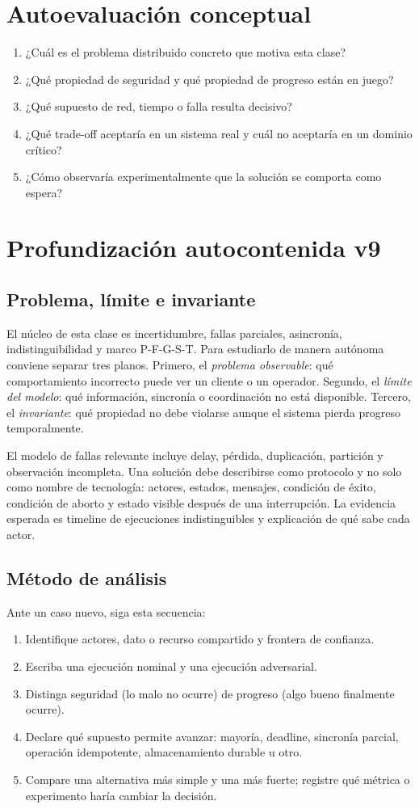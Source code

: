 \documentclass[variant=apuntes,cover=institutional,mode=screen]{ua-engineering-v6-article}
\begin{document}
\section{Autoevaluación conceptual}
\begin{enumerate}
\item ¿Cuál es el problema distribuido concreto que motiva esta clase?
\item ¿Qué propiedad de seguridad y qué propiedad de progreso están en juego?
\item ¿Qué supuesto de red, tiempo o falla resulta decisivo?
\item ¿Qué trade-off aceptaría en un sistema real y cuál no aceptaría en un dominio crítico?
\item ¿Cómo observaría experimentalmente que la solución se comporta como espera?
\end{enumerate}

\section{Profundización autocontenida v9}
\subsection{Problema, límite e invariante}
El núcleo de esta clase es incertidumbre, fallas parciales, asincronía, indistinguibilidad y marco P-F-G-S-T. Para estudiarlo de manera autónoma conviene separar tres planos. Primero, el \emph{problema observable}: qué comportamiento incorrecto puede ver un cliente o un operador. Segundo, el \emph{límite del modelo}: qué información, sincronía o coordinación no está disponible. Tercero, el \emph{invariante}: qué propiedad no debe violarse aunque el sistema pierda progreso temporalmente.

El modelo de fallas relevante incluye delay, pérdida, duplicación, partición y observación incompleta. Una solución debe describirse como protocolo y no solo como nombre de tecnología: actores, estados, mensajes, condición de éxito, condición de aborto y estado visible después de una interrupción. La evidencia esperada es timeline de ejecuciones indistinguibles y explicación de qué sabe cada actor.

\subsection{Método de análisis}
Ante un caso nuevo, siga esta secuencia:
\begin{enumerate}
\item Identifique actores, dato o recurso compartido y frontera de confianza.
\item Escriba una ejecución nominal y una ejecución adversarial.
\item Distinga seguridad (lo malo no ocurre) de progreso (algo bueno finalmente ocurre).
\item Declare qué supuesto permite avanzar: mayoría, deadline, sincronía parcial, operación idempotente, almacenamiento durable u otro.
\item Compare una alternativa más simple y una más fuerte; registre qué métrica o experimento haría cambiar la decisión.
\end{enumerate}
\end{document}
